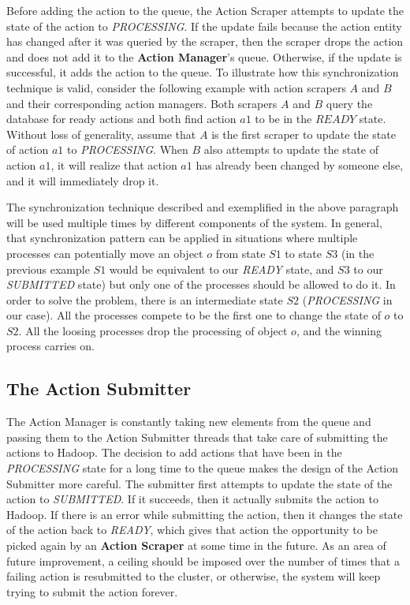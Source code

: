 Before adding the action to the queue, the Action Scraper attempts to update the state of the action to \textit{PROCESSING}. If the update fails because the action entity has changed after it was queried by the scraper, then the scraper drops the action and does not add it to the \textbf{Action Manager}'s queue. Otherwise, if the update is successful, it adds the action to the queue. To illustrate how this synchronization technique is valid, consider the following example with action scrapers $A$ and $B$ and their corresponding action managers. Both scrapers $A$ and $B$ query the database for ready actions and both find action $a1$ to be in the $READY$ state. Without loss of generality, assume that $A$ is the first scraper to update the state of action $a1$ to \textit{PROCESSING}. When $B$ also attempts to update the state of action $a1$, it will realize that action $a1$ has already been changed by someone else, and it will immediately drop it.

The synchronization technique described and exemplified in the above paragraph will be used multiple times by different components of the system. In general, that synchronization pattern can be applied in situations where multiple processes can potentially move an object $o$ from state $S1$ to state $S3$ (in the previous example $S1$ would be equivalent to our \textit{READY} state, and $S3$ to our \textit{SUBMITTED} state) but only one of the processes should be allowed to do it. In order to solve the problem, there is an intermediate state $S2$ (\textit{PROCESSING} in our case).  All the processes compete to be the first one to change the state of $o$ to $S2$. All the loosing processes drop the processing of object $o$, and the winning process carries on.

\subsection{The Action Submitter}
The Action Manager is constantly taking new elements from the queue and passing them to the Action Submitter threads that take care of submitting the actions to Hadoop. The decision to add actions that have been in the \textit{PROCESSING} state for a long time to the queue makes the design of the Action Submitter more careful. The submitter first attempts to update the state of the action to \textit{SUBMITTED}. If it succeeds, then it actually submits the action to Hadoop. If there is an error while submitting the action, then it changes the state of the action back to \textit{READY}, which gives that action the opportunity to be picked again by an \textbf{Action Scraper} at some time in the future. As an area of future improvement, a ceiling should be imposed over the number of times that a failing action is resubmitted to the cluster, or otherwise, the system will keep trying to submit the action forever.

